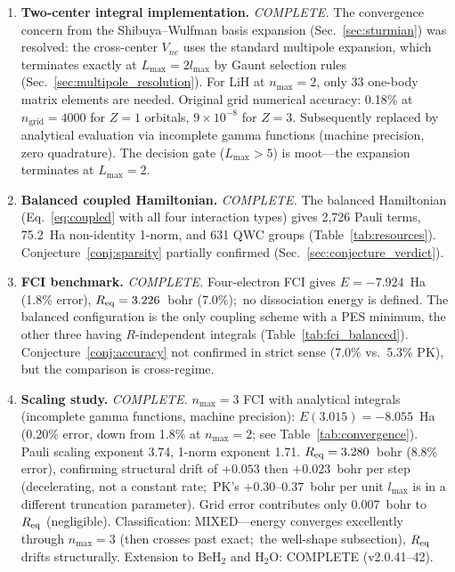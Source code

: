 \documentclass[aps,pra,twocolumn,superscriptaddress,longbibliography]{revtex4-2}
\begin{document}
\begin{enumerate}
\item \textbf{Two-center integral implementation.}  \emph{COMPLETE.}
  The convergence concern from the Shibuya--Wulfman basis expansion
  (Sec.~\ref{sec:sturmian}) was resolved: the cross-center $V_{ne}$
  uses the standard multipole expansion, which terminates exactly at
  $L_{\max} = 2 l_{\max}$ by Gaunt selection rules
  (Sec.~\ref{sec:multipole_resolution}).  For LiH at $n_{\max} = 2$,
  only 33 one-body matrix elements are needed.  Original grid numerical accuracy:
  0.18\% at $n_{\mathrm{grid}} = 4000$ for $Z = 1$ orbitals,
  $9 \times 10^{-8}$ for $Z = 3$.  Subsequently replaced by analytical
  evaluation via incomplete gamma functions (machine precision, zero
  quadrature).  The decision gate ($L_{\max} > 5$)
  is moot---the expansion terminates at $L_{\max} = 2$.

\item \textbf{Balanced coupled Hamiltonian.}  \emph{COMPLETE.}
  The balanced Hamiltonian (Eq.~\ref{eq:coupled} with all four
  interaction types) gives 2{,}726 Pauli terms, 75.2~Ha non-identity
  1-norm, and 631 QWC groups (Table~\ref{tab:resources}).
  Conjecture~\ref{conj:sparsity} partially confirmed
  (Sec.~\ref{sec:conjecture_verdict}).

\item \textbf{FCI benchmark.}  \emph{COMPLETE.}
  Four-electron FCI gives $E = -7.924$~Ha (1.8\% error),
  $R_{\rm eq} = 3.226$~bohr (7.0\%);\ no dissociation energy is
  defined.  The balanced configuration is the only coupling scheme with a
  PES minimum, the other three having $R$-independent integrals
  (Table~\ref{tab:fci_balanced}).  Conjecture~\ref{conj:accuracy}
  not confirmed in strict sense (7.0\% vs.\ 5.3\% PK), but the
  comparison is cross-regime.

\item \textbf{Scaling study.}  \emph{COMPLETE.}  $n_{\max} = 3$
  FCI with analytical integrals (incomplete gamma functions, machine
  precision): $E(3.015) = -8.055$~Ha (0.20\% error, down from 1.8\%
  at $n_{\max} = 2$; see Table~\ref{tab:convergence}).
  Pauli scaling exponent 3.74, 1-norm exponent 1.71.
  $R_{\rm eq} = 3.280$~bohr (8.8\% error), confirming structural drift
  of $+0.053$ then $+0.023$~bohr per step (decelerating, not a constant rate;\ PK's
  $+0.30$--$0.37$~bohr per unit $l_{\max}$ is in a different truncation
  parameter).  Grid error contributes only
  0.007~bohr to $R_{\rm eq}$ (negligible).  Classification: MIXED---energy
  converges excellently through $n_{\max}=3$ (then crosses past exact;\ the
  well-shape subsection), $R_{\rm eq}$ drifts structurally.
  Extension to BeH$_2$ and H$_2$O: COMPLETE (v2.0.41--42).
\end{enumerate}
\end{document}

